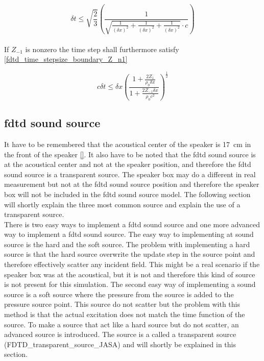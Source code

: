 \begin{equation}\label{fdtd_time_stepsize_boundary}
\delta t \leq \sqrt{\frac{2}{3}}  \left( \frac{1}{\sqrt{\frac{1}{(\delta x)^2}+\frac{1}{(\delta x)^2}+\frac{1}{(\delta x)^2} }\cdot c} \right)
\end{equation}\\


If $Z_{-1}$ is nonzero the time step shall furthermore satisfy \autoref{fdtd_time_stepsize_boundary_Z_n1}

\begin{equation}\label{fdtd_time_stepsize_boundary_Z_n1}
c \delta t \leq \delta x \left(   \frac{1+\frac{2Z_1}{\rho_0 \delta x}}{1+\frac{2Z_{-1} \delta x}{\rho_0 c^2}}  \right)^{\frac{1}{2}}
\end{equation}

\subsection{\gls{fdtd} sound source}
It have to be remembered that the acoustical center of the speaker is \SI{17}{\centi\meter} in the front of the speaker \autoref{}. It also have to be noted that the \gls{fdtd} sound source is at the acoustical center and not at the speaker position, and therefore the \gls{fdtd} sound source is a transparent source. The speaker box may do a different in real measurement but not at the \gls{fdtd} sound source position and therefore the speaker box will not be included in the \gls{fdtd} sound source model. The following section will shortly explain the three most common source and explain the use of a transparent source. \\

There is two easy ways to implement a \gls{fdtd} sound source and one more advanced way to implement a \gls{fdtd} sound source. The easy way to implementing at sound source is the hard and the soft source. The problem with implementing a hard source is that the hard source overwrite the update step in the source point and therefore effectively scatter any incident field. This might be a real scenario if the speaker box was at the acoustical, but it is not and therefore this kind of source is not present for this simulation.  The second easy way of implementing a sound source is a soft source where the pressure from the source is added to the pressure source point. This source do not scatter but the problem with this method is that the actual excitation does not match the time function of the source. To make a source that act like a hard source but do not scatter, an advanced source is introduced. The source is a called a transparent source (FDTD_transparent_source_JASA)  and will shortly be explained in this section. \\

